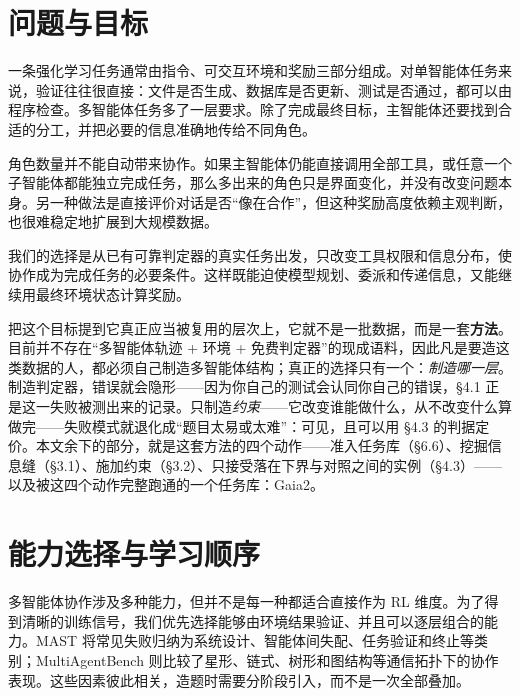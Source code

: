 \documentclass[UTF8,11pt,fontset=fandol]{ctexart}
\begin{document}
\clearpage
\thispagestyle{empty}
{\setlength{\parskip}{0pt}
\renewcommand{\contentsname}{\normalsize\bfseries 目录}
\tableofcontents}

\clearpage
\hypersetup{pageanchor=true}

\section{问题与目标}

一条强化学习任务通常由指令、可交互环境和奖励三部分组成。对单智能体任务来说，验证往往很直接：文件是否生成、数据库是否更新、测试是否通过，都可以由程序检查。多智能体任务多了一层要求。除了完成最终目标，主智能体还要找到合适的分工，并把必要的信息准确地传给不同角色。

角色数量并不能自动带来协作。如果主智能体仍能直接调用全部工具，或任意一个子智能体都能独立完成任务，那么多出来的角色只是界面变化，并没有改变问题本身。另一种做法是直接评价对话是否“像在合作”，但这种奖励高度依赖主观判断，也很难稳定地扩展到大规模数据。

我们的选择是从已有可靠判定器的真实任务出发，只改变工具权限和信息分布，使协作成为完成任务的必要条件。这样既能迫使模型规划、委派和传递信息，又能继续用最终环境状态计算奖励。

把这个目标提到它真正应当被复用的层次上，它就不是一批数据，而是一套\textbf{方法}。目前并不存在“多智能体轨迹 + 环境 + 免费判定器”的现成语料，因此凡是要造这类数据的人，都必须自己制造多智能体结构；真正的选择只有一个：\emph{制造哪一层}。制造判定器，错误就会隐形——因为你自己的测试会认同你自己的错误，\S4.1 正是这一失败被测出来的记录。只制造\emph{约束}——它改变谁能做什么，从不改变什么算做完——失败模式就退化成“题目太易或太难”：可见，且可以用 \S4.3 的判据定价。本文余下的部分，就是这套方法的四个动作——准入任务库（\S6.6）、挖掘信息缝（\S3.1）、施加约束（\S3.2）、只接受落在下界与对照之间的实例（\S4.3）——以及被这四个动作完整跑通的一个任务库：Gaia2。

\section{能力选择与学习顺序}

多智能体协作涉及多种能力，但并不是每一种都适合直接作为 RL 维度。为了得到清晰的训练信号，我们优先选择能够由环境结果验证、并且可以逐层组合的能力。MAST 将常见失败归纳为系统设计、智能体间失配、任务验证和终止等类别\cite{cemri2025mast}；MultiAgentBench 则比较了星形、链式、树形和图结构等通信拓扑下的协作表现\cite{zhu2025multiagentbench}。这些因素彼此相关，造题时需要分阶段引入，而不是一次全部叠加。
\end{document}

